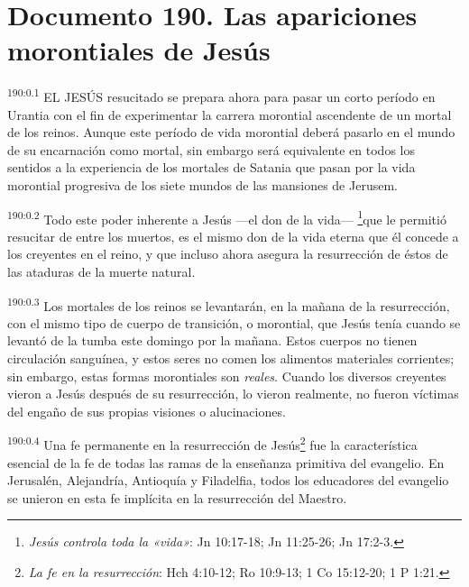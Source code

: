 \chapter{Documento 190. Las apariciones morontiales de Jesús}
\par 
\textsuperscript{190:0.1} EL JESÚS resucitado se prepara ahora para pasar un corto período en Urantia con el fin de experimentar la carrera morontial ascendente de un mortal de los reinos. Aunque este período de vida morontial deberá pasarlo en el mundo de su encarnación como mortal, sin embargo será equivalente en todos los sentidos a la experiencia de los mortales de Satania que pasan por la vida morontial progresiva de los siete mundos de las mansiones de Jerusem.

\par 
\textsuperscript{190:0.2} Todo este poder inherente a Jesús ---el don de la vida--- \footnote{\textit{Jesús controla toda la «vida»}: Jn 10:17-18; Jn 11:25-26; Jn 17:2-3.}que le permitió resucitar de entre los muertos, es el mismo don de la vida eterna que él concede a los creyentes en el reino, y que incluso ahora asegura la resurrección de éstos de las ataduras de la muerte natural.

\par 
\textsuperscript{190:0.3} Los mortales de los reinos se levantarán, en la mañana de la resurrección, con el mismo tipo de cuerpo de transición, o morontial, que Jesús tenía cuando se levantó de la tumba este domingo por la mañana. Estos cuerpos no tienen circulación sanguínea, y estos seres no comen los alimentos materiales corrientes; sin embargo, estas formas morontiales son \textit{reales}. Cuando los diversos creyentes vieron a Jesús después de su resurrección, lo vieron realmente, no fueron víctimas del engaño de sus propias visiones o alucinaciones.

\par 
\textsuperscript{190:0.4} Una fe permanente en la resurrección de Jesús\footnote{\textit{La fe en la resurrección}: Hch 4:10-12; Ro 10:9-13; 1 Co 15:12-20; 1 P 1:21.} fue la característica esencial de la fe de todas las ramas de la enseñanza primitiva del evangelio. En Jerusalén, Alejandría, Antioquía y Filadelfia, todos los educadores del evangelio se unieron en esta fe implícita en la resurrección del Maestro.

